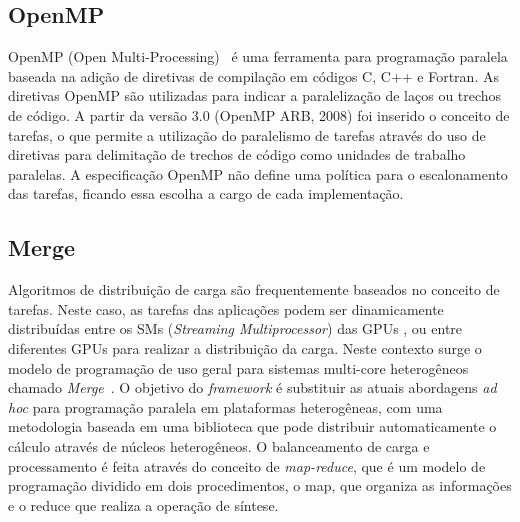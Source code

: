 \subsection{OpenMP}

OpenMP (Open Multi-Processing)~\citep{Quinn:2003:PPC:1211440} é uma ferramenta para programação paralela baseada na adição de diretivas de compilação em códigos C, C++ e Fortran. As diretivas OpenMP são utilizadas para indicar a paralelização de laços ou trechos de código. A partir da versão 3.0 (OpenMP ARB, 2008) foi inserido o conceito de tarefas, o que permite a utilização do paralelismo de tarefas através do uso de diretivas para delimitação de trechos de código como unidades de trabalho paralelas. A especificação OpenMP não define uma política para o escalonamento das tarefas, ficando essa escolha a cargo de cada implementação.


\subsection{Merge}

Algoritmos de distribuição de carga são frequentemente baseados no conceito de tarefas. Neste caso, as tarefas das aplicações podem ser dinamicamente distribuídas entre os SMs (\textit{Streaming Multiprocessor}) das GPUs \citep{dynamicLoad}, ou entre diferentes GPUs \citep{starpu} para realizar a distribuição da carga. Neste contexto surge o modelo de programação de uso geral para sistemas multi-core heterogêneos chamado \textit{Merge}~\citep{merge}. O objetivo do \textit{framework} é substituir as atuais abordagens \textit{ad hoc} para programação paralela em plataformas heterogêneas, com uma metodologia baseada em uma biblioteca que pode distribuir automaticamente o cálculo através de núcleos heterogêneos. O balanceamento de carga e processamento é feita através do conceito de \textit{map-reduce}, que é um modelo de programação dividido em dois procedimentos, o map, que organiza as informações e o reduce que realiza a operação de síntese. 





